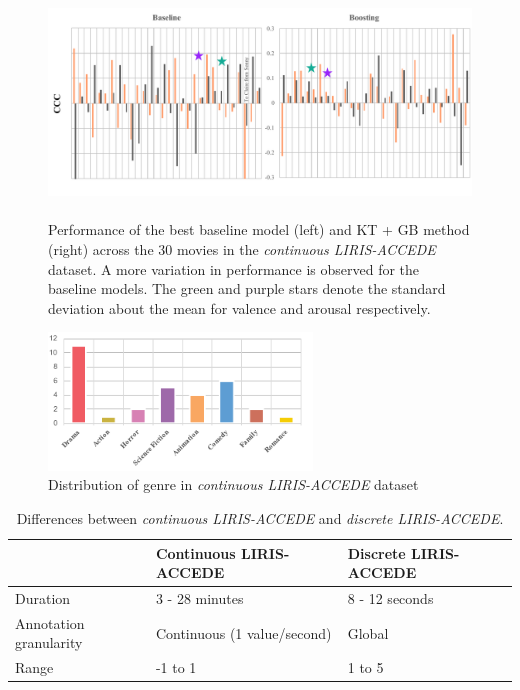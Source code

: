 \documentclass{article}
\begin{document}
\begin{figure}[t]
\includegraphics[width=\textwidth, height = 6cm]{images/comparison.pdf}
\centering
\vspace{-11mm}
\caption{Performance of the best baseline model (left) and KT + GB method (right) across the 30 movies in the {\it continuous LIRIS-ACCEDE} dataset. A more variation in performance is observed for the baseline models. The green and purple stars denote the standard deviation about the mean for valence and arousal respectively.}
\label{comparison}
\end{figure}

\begin{figure}[t]
\includegraphics[width=7cm]{genre2}
\centering
\caption{Distribution of genre in {\it continuous LIRIS-ACCEDE} dataset}
\label{genre}
\end{figure}

\begin{table}[t]
\centering
\caption{Differences between {\it continuous LIRIS-ACCEDE} and {\it discrete LIRIS-ACCEDE}.}
\begin{tabular}{l|p{2.2cm}|p{2.2cm}}\hline
				& Continuous LIRIS-ACCEDE	& Discrete LIRIS-ACCEDE \\ \hline
Duration			& 3 - 28 minutes			& 8 - 12 seconds		\\ \hline	
Annotation granularity & Continuous (1 value/second)				& Global 				\\ \hline
Range			& -1 to 1					& 1 to 5				\\ 
\end{tabular}
\label{differences}
\end{table}
\end{document}
